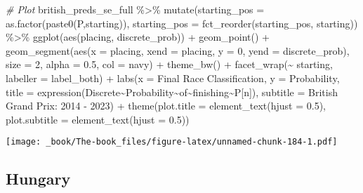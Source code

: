 \documentclass[
]{book}
\newenvironment{Shaded}{\begin{snugshade}}{\end{snugshade}}
\newcommand{\AttributeTok}[1]{\textcolor[rgb]{0.77,0.63,0.00}{#1}}
\newcommand{\CommentTok}[1]{\textcolor[rgb]{0.56,0.35,0.01}{\textit{#1}}}
\newcommand{\DecValTok}[1]{\textcolor[rgb]{0.00,0.00,0.81}{#1}}
\newcommand{\FloatTok}[1]{\textcolor[rgb]{0.00,0.00,0.81}{#1}}
\newcommand{\FunctionTok}[1]{\textcolor[rgb]{0.00,0.00,0.00}{#1}}
\newcommand{\NormalTok}[1]{#1}
\newcommand{\SpecialCharTok}[1]{\textcolor[rgb]{0.00,0.00,0.00}{#1}}
\newcommand{\StringTok}[1]{\textcolor[rgb]{0.31,0.60,0.02}{#1}}
\begin{document}
\begin{Shaded}
\begin{Highlighting}[]
\CommentTok{\# Plot}
\NormalTok{british\_preds\_se\_full }\SpecialCharTok{\%\textgreater{}\%}
  \FunctionTok{mutate}\NormalTok{(}\AttributeTok{starting\_pos =} \FunctionTok{as.factor}\NormalTok{(}\FunctionTok{paste0}\NormalTok{(}\StringTok{\textquotesingle{}P\textquotesingle{}}\NormalTok{,starting)),}
         \AttributeTok{starting\_pos =} \FunctionTok{fct\_reorder}\NormalTok{(starting\_pos, starting)) }\SpecialCharTok{\%\textgreater{}\%}
  \FunctionTok{ggplot}\NormalTok{(}\FunctionTok{aes}\NormalTok{(placing, discrete\_prob)) }\SpecialCharTok{+}
  \FunctionTok{geom\_point}\NormalTok{() }\SpecialCharTok{+}
  \FunctionTok{geom\_segment}\NormalTok{(}\FunctionTok{aes}\NormalTok{(}\AttributeTok{x =}\NormalTok{ placing, }\AttributeTok{xend =}\NormalTok{ placing, }\AttributeTok{y =} \DecValTok{0}\NormalTok{, }\AttributeTok{yend =}\NormalTok{ discrete\_prob),}
               \AttributeTok{size =} \DecValTok{2}\NormalTok{, }\AttributeTok{alpha =} \FloatTok{0.5}\NormalTok{, }\AttributeTok{col =} \StringTok{\textquotesingle{}navy\textquotesingle{}}\NormalTok{) }\SpecialCharTok{+}
  \FunctionTok{theme\_bw}\NormalTok{() }\SpecialCharTok{+}
  \FunctionTok{facet\_wrap}\NormalTok{(}\SpecialCharTok{\textasciitilde{}}\NormalTok{ starting, }\AttributeTok{labeller =}\NormalTok{ label\_both) }\SpecialCharTok{+}
  \FunctionTok{labs}\NormalTok{(}\AttributeTok{x =} \StringTok{\textquotesingle{}Final Race Classification\textquotesingle{}}\NormalTok{,}
       \AttributeTok{y =} \StringTok{\textquotesingle{}Probability\textquotesingle{}}\NormalTok{,}
       \AttributeTok{title =} \FunctionTok{expression}\NormalTok{(Discrete}\SpecialCharTok{\textasciitilde{}}\NormalTok{Probability}\SpecialCharTok{\textasciitilde{}}\NormalTok{of}\SpecialCharTok{\textasciitilde{}}\NormalTok{finishing}\SpecialCharTok{\textasciitilde{}}\NormalTok{P[n]),}
       \AttributeTok{subtitle =} \StringTok{\textquotesingle{}British Grand Prix: 2014 {-} 2023\textquotesingle{}}\NormalTok{) }\SpecialCharTok{+}
  \FunctionTok{theme}\NormalTok{(}\AttributeTok{plot.title =} \FunctionTok{element\_text}\NormalTok{(}\AttributeTok{hjust =} \FloatTok{0.5}\NormalTok{),}
        \AttributeTok{plot.subtitle =} \FunctionTok{element\_text}\NormalTok{(}\AttributeTok{hjust =} \FloatTok{0.5}\NormalTok{)) }
\end{Highlighting}
\end{Shaded}

\texttt{[image: \_book/The-book\_files/figure-latex/unnamed-chunk-184-1.pdf]}

\hypertarget{hungary}{%
\subsection{Hungary}\label{hungary}}
\end{document}
